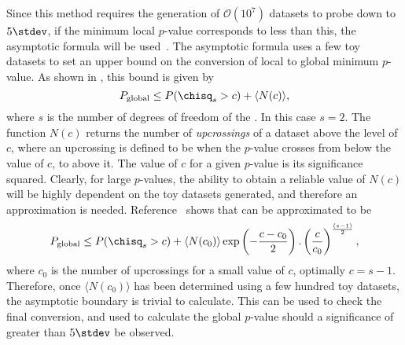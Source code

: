 Since this method requires the generation of $\mathcal{O}(10^7)$ datasets to probe down to
$5\stdev$, if the minimum local $p$-value corresponds to less than this, the asymptotic formula
will be used~\cite{Gross:2010qma}.
The asymptotic formula uses a few toy datasets to set an upper bound on the conversion of local to
global minimum $p$-value.
As shown in , this bound is given by
\begin{equation}
  P_\mathrm{global} \leq P(\chisq_s > c) + \langle N(c)\rangle,
  \label{eq:db:asy1}
\end{equation}
where $s$ is the number of degrees of freedom of the \chisq.
In this case $s=2$.
The function $N(c)$ returns the number of \emph{upcrossings} of a dataset above the level of $c$,
where an upcrossing is defined to be when the $p$-value crosses from below the value of
$c$, to above it.
The value of $c$ for a given $p$-value is its significance squared.
Clearly, for large $p$-values, the ability to obtain a reliable value of $N(c)$ will be highly
dependent on the toy datasets generated, and therefore an approximation is needed.
Reference~\cite{Gross:2010qma} shows that  can be approximated to be
\begin{equation}
  P_\mathrm{global} \leq P(\chisq_s > c)
  + \langle N(c_0)\rangle
  \exp\left(-\frac{c-c_0}{2}\right).
  \left(\frac{c}{c_0}\right)^{\frac{(s-1)}{2}},
  \label{eq:db:asy2}
\end{equation}
where $c_0$ is the number of upcrossings for a small value of $c$, optimally $c=s-1$.
Therefore, once $\langle N(c_0)\rangle$ has been determined using a few hundred toy datasets, the
asymptotic boundary is trivial to calculate.
This can be used to check the final conversion, and used to calculate the global $p$-value should a
significance of greater than $5\stdev$ be observed.


